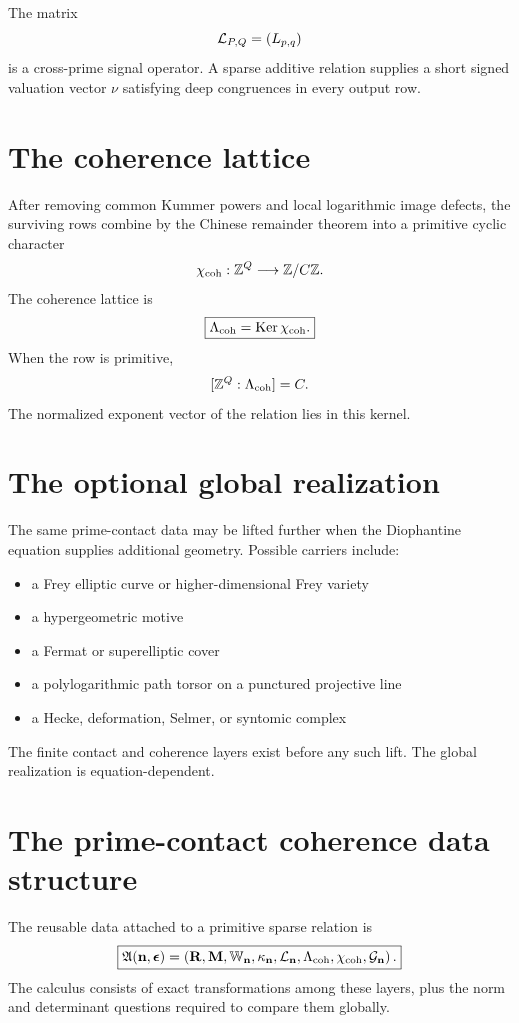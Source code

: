 The matrix
\[
\mathcal L_{P,Q}=(L_{p,q})
\]
is a cross-prime signal operator. A sparse additive relation supplies a short signed valuation vector $\nu$ satisfying deep congruences in every output row.

\section{The coherence lattice}
After removing common Kummer powers and local logarithmic image defects, the surviving rows combine by the Chinese remainder theorem into a primitive cyclic character
\[
\chi_{\mathrm{coh}}:\mathbb Z^Q\longrightarrow\mathbb Z/C\mathbb Z.
\]
The coherence lattice is
\[
\boxed{
\Lambda_{\mathrm{coh}}
=
\operatorname{Ker}\chi_{\mathrm{coh}}.
}
\]
When the row is primitive,
\[
[\mathbb Z^Q:\Lambda_{\mathrm{coh}}]=C.
\]
The normalized exponent vector of the relation lies in this kernel.

\section{The optional global realization}
The same prime-contact data may be lifted further when the Diophantine equation supplies additional geometry. Possible carriers include:
\begin{itemize}[leftmargin=1.5em]
\item a Frey elliptic curve or higher-dimensional Frey variety
\item a hypergeometric motive
\item a Fermat or superelliptic cover
\item a polylogarithmic path torsor on a punctured projective line
\item a Hecke, deformation, Selmer, or syntomic complex
\end{itemize}
The finite contact and coherence layers exist before any such lift. The global realization is equation-dependent.

\section{The prime-contact coherence data structure}
The reusable data attached to a primitive sparse relation is
\[
\boxed{
\mathfrak A(\mathbf n,\boldsymbol\epsilon)
=
\left(
\mathbf R,
\mathbf M,
\mathbb W_{\mathbf n},
\kappa_{\mathbf n},
\mathcal L_{\mathbf n},
\Lambda_{\mathrm{coh}},
\chi_{\mathrm{coh}},
\mathcal G_{\mathbf n}
\right).
}
\]
The calculus consists of exact transformations among these layers, plus the norm and determinant questions required to compare them globally.

